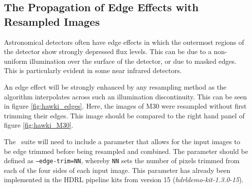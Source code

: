 \begin{table}
\begin{center}
\begin{tabular}{|l|l|c|c|c|c|c|c|c|c|c|c|}
\end{tabular}	
\end{center}																											

\label{tab:compare_rotation}
\end{table}



\subsection{The Propagation of Edge Effects with Resampled Images}

Astronomical detectors often have edge effects in which the outermost regions of the detector show strongly depressed flux levels.
This can be due to a non-uniform illumination over the surface of the detector, or due to masked edges.   This is particularly evident
in some near infrared detectors.

An edge effect will be strongly enhanced by any resampling method as the algorithm interpolates across such an illumination
discontinuity.   This can be seen in figure \ref{fig:hawki_edges}.  Here, the images of M30 were resampled without first trimming their
edges.  This image should be compared to the right hand panel of figure \ref{fig:hawki_M30}.

The \hdrlresample\ suite will need to include a parameter that allows for the input images to be edge trimmed before
being resampled and combined.  The parameter should be defined as {\tt --edge-trim=NN}, whereby {\tt NN} sets the number of pixels
trimmed from each of the four sides of each input image.
This parameter has already been implemented in the HDRL pipeline kits from version 15 ({\it hdrldemo-kit-1.3.0-15}).

